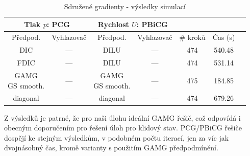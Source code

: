\documentclass[a4paper,12pt]{report}
\theoremstyle{remark}
\begin{document}
\begin{table}[H]
\centering
\caption{Sdružené gradienty - výsledky simulací}
\renewcommand{\arraystretch}{1.9}
\begin{tabular}{*7c}
\toprule	
\multicolumn{2}{c}{Tlak $p$: \textbf{PCG}} & \multicolumn{2}{c}{Rychlost $U$: \textbf{PBiCG}}\\
	\midrule
	Předpod.&Vyhlazovač&Předpod.&Vyhlazovač&\# kroků&Čas (s)\\
	\midrule
	 DIC & --- &  DILU & --- &474&540.48\\
	FDIC & --- &  DILU & --- &474&531.14\\	
	 \shortstack{GAMG\\GS smooth.}& --- &  \shortstack{GAMG\\GS smooth.}& --- &475&184.85\\
	diagonal & --- & diagonal & ---&474&679.26\\	
	\bottomrule
\end{tabular}
\label{table:solvers_PCG}
\end{table}
Z výsledků je patrné, že pro naši úlohu ideální GAMG řešič, což odpovídá i obecným doporučením pro řešení úloh pro klidový stav. PCG/PBiCG řešiče dospějí ke stejným výsledkům, v podobném počtu iterací, jen za víc jak dvojnásobný čas, kromě varianty s použitím GAMG předpodmínění. 
\end{document}
